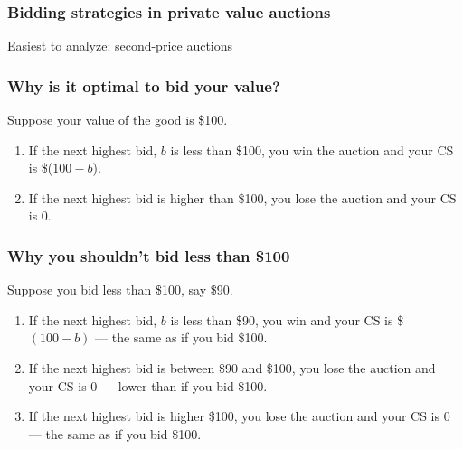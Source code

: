 \documentclass[xcolor=pdftex,dvipsnames]{beamer}
\begin{document}
\begin{frame}
  \frametitle{Bidding strategies in private value auctions}
  Easiest to analyze: second-price auctions
  \bigskip


  \bigskip


\bigskip
{}
\end{frame}
\begin{frame}
  \frametitle{Why is it optimal to bid your value?}
  Suppose your value of the good is \$100.
\bigskip

\begin{enumerate}
\item<3-> If the next highest bid, $b$ is less than \$100, you win  the
  auction and your CS is \$($100 - b$).
\item <4-> If the next highest bid is higher than \$100, you lose the
  auction and your CS is 0.
\end{enumerate}

\end{frame}

\begin{frame}
  \frametitle{Why you shouldn't bid less than \$100}
Suppose you bid less than \$100, say \$90.
\begin{enumerate}
\item <2-> If the next highest bid, $b$ is less than \$90, you win and
  your CS is \$$(100-b)$ --- the same as if you bid \$100.
\item<3-> If the next highest bid is between \$90 and \$100, you
  lose the auction and your CS is 0 --- lower than if you bid \$100.
\item<4-> If the next highest bid is higher \$100, you
lose the auction and your CS is 0  --- the same as if you bid \$100.
\end{enumerate}

\end{frame}
\end{document}
